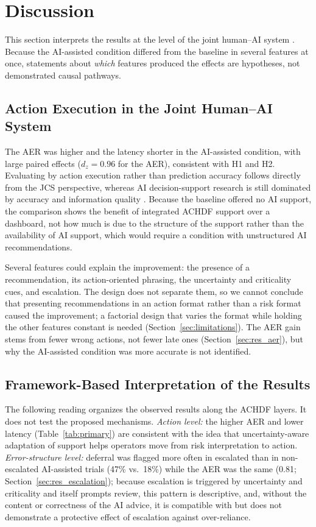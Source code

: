\documentclass[journal]{IEEEtran}
\theoremstyle{plain}
\theoremstyle{definition}
\begin{document}
\section{Discussion}
\label{sec:discussion}
This section interprets the results at the level of the joint human--AI system \cite{Hollnagel2005JCS,Woods2006JCS}. Because the AI-assisted condition differed from the baseline in several features at once, statements about \emph{which} features produced the effects are hypotheses, not demonstrated causal pathways.

\subsection{Action Execution in the Joint Human--AI System}
The AER was higher and the latency shorter in the AI-assisted condition, with large paired effects ($d_z=0.96$ for the AER), consistent with H1 and H2. Evaluating by action execution rather than prediction accuracy follows directly from the JCS perspective, whereas AI decision-support research is still dominated by accuracy and information quality \cite{Lai2023FAccT,Muller2022CHIWORK,Yang2022THMSReview}. Because the baseline offered no AI support, the comparison shows the benefit of integrated ACHDF support over a dashboard, not how much is due to the structure of the support rather than the availability of AI support, which would require a condition with unstructured AI recommendations.

Several features could explain the improvement: the presence of a recommendation, its action-oriented phrasing, the uncertainty and criticality cues, and escalation. The design does not separate them, so we cannot conclude that presenting recommendations in an action format rather than a risk format caused the improvement; a factorial design that varies the format while holding the other features constant is needed (Section~\ref{sec:limitations}). The AER gain stems from fewer wrong actions, not fewer late ones (Section~\ref{sec:res_aer}), but why the AI-assisted condition was more accurate is not identified.

\subsection{Framework-Based Interpretation of the Results}
\label{sec:interpretation}
The following reading organizes the observed results along the ACHDF layers. It does not test the proposed mechanisms. \emph{Action level:} the higher AER and lower latency (Table~\ref{tab:primary}) are consistent with the idea that uncertainty-aware adaptation of support helps operators move from risk interpretation to action. \emph{Error-structure level:} deferral was flagged more often in escalated than in non-escalated AI-assisted trials (47\% vs.\ 18\%) while the AER was the same (0.81; Section~\ref{sec:res_escalation}); because escalation is triggered by uncertainty and criticality and itself prompts review, this pattern is descriptive, and, without the content or correctness of the AI advice, it is compatible with but does not demonstrate a protective effect of escalation against over-reliance.
\end{document}
